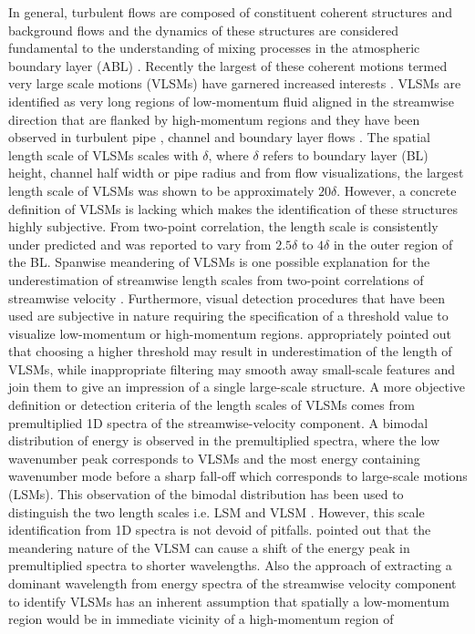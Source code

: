 \documentclass{svjour3}                     %
\begin{document}
\label{intro} 
In general, turbulent flows  are composed of constituent coherent structures and background flows \citep{hussain_1986_jfm} and the dynamics of these structures are considered fundamental to the understanding of mixing processes in the atmospheric boundary layer (ABL) \citep{lewalle_flowTurbCom_00,Fiedler_PAeroSci_1988}. Recently the largest of these coherent motions termed very large scale motions (VLSMs) have garnered increased interests \citep[e.g. ][]{Chinthaka_blm_2017,kerherv_roux_etfs_2017}. VLSMs  are identified as  very long regions of low-momentum fluid aligned in the streamwise direction that are flanked by high-momentum regions and they have been observed in turbulent pipe \citep{guala_adrian_jfm2006, kim_adrian_pof99, monty_jfm_07}, channel \citep{guala_adrian_jfm2006, monty_jfm_07, lee_sung_jfm_14} and boundary layer flows \citep{fang2015blm,hutchins_marusic_jfm2007}. The spatial length scale of VLSMs scales with $\delta$, where $\delta$ refers to boundary layer (BL)  height, channel half width or pipe radius \citep{chung_jfm_10_large,monty_jfm_07} and from flow visualizations, the largest length scale of VLSMs was shown to be approximately $20\delta$. However, a concrete definition of VLSMs is lacking which makes the identification of these structures highly subjective. From two-point correlation, the length scale is consistently under predicted and was reported to vary from $2.5\delta$ to $4\delta$ in the outer region of the BL. Spanwise meandering of VLSMs is one possible explanation for the underestimation of streamwise length scales from two-point correlations of streamwise velocity \citep{hutchins_marusic_jfm2007}. Furthermore, visual detection procedures that have been used are subjective in nature requiring the specification of a threshold value to visualize low-momentum or high-momentum regions. \citet{dennis_nickels_jfm2011} appropriately pointed out that choosing a higher threshold may result in underestimation of the length of VLSMs, while inappropriate filtering may smooth away small-scale features and join them to give an impression of a single large-scale structure. A more objective definition or detection criteria of the length scales of VLSMs comes from premultiplied 1D spectra of the streamwise-velocity component. A bimodal distribution of energy is observed in the premultiplied spectra, where the low wavenumber peak corresponds to VLSMs and the most energy containing wavenumber mode before a sharp fall-off  which corresponds to large-scale motions (LSMs). This observation of the bimodal distribution has been used to distinguish the two length scales i.e. LSM and VLSM \citep{kim_adrian_pof99,balakumar_adrian_ptrs_07,guala_adrian_jfm2006}. However, this scale identification from 1D spectra is not devoid of pitfalls. \citet{hutchins_marusic_jfm2007}  pointed out that the meandering nature of the VLSM can cause a shift of the energy peak in premultiplied spectra to shorter wavelengths. Also the approach of extracting a dominant wavelength from energy spectra of the streamwise velocity component to identify VLSMs has an inherent assumption \citep{baltzer_jfm_13} that spatially a low-momentum region would be in immediate vicinity of a high-momentum region of 
\end{document}
